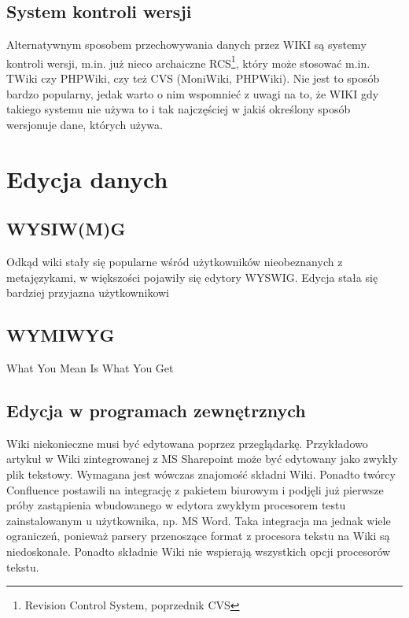 \documentclass{article}
\begin{document}
	\subsection{System kontroli wersji}
	Alternatywnym sposobem przechowywania danych przez WIKI są systemy kontroli wersji, m.in. już nieco archaiczne RCS\footnote{Revision Control System, poprzednik CVS}, który może stosować m.in. TWiki czy PHPWiki, czy też CVS (MoniWiki, PHPWiki). Nie jest to sposób bardzo popularny, jedak warto o nim wspomnieć z uwagi na to, że WIKI gdy takiego systemu nie używa to i tak najczęściej w jakiś określony sposób wersjonuje dane, których używa.
\newpage
\section{Edycja danych}
	\subsection{WYSIW(M)G}
	Odkąd wiki stały się popularne wśród użytkowników nieobeznanych z metajęzykami, 
w większości pojawiły się edytory WYSWIG. Edycja stała się bardziej przyjazna użytkownikowi

	\subsection{WYMIWYG}
What You Mean Is What You Get

	\subsection{Edycja w programach zewnętrznych}

Wiki niekonieczne musi być edytowana poprzez przeglądarkę. Przykładowo artykuł w Wiki zintegrowanej z MS Sharepoint może być edytowany jako zwykły plik tekstowy. Wymagana jest wówczas znajomość składni Wiki. Ponadto twórcy Confluence postawili na integrację z pakietem biurowym i podjęli już pierwsze próby zastąpienia wbudowanego w edytora zwykłym procesorem testu zainstalowanym u użytkownika, np. MS Word. Taka integracja ma jednak wiele ograniczeń, ponieważ parsery przenoszące format z procesora tekstu na Wiki są niedoskonałe. Ponadto składnie Wiki nie wspierają wszystkich opcji procesorów tekstu. 
\end{document}

